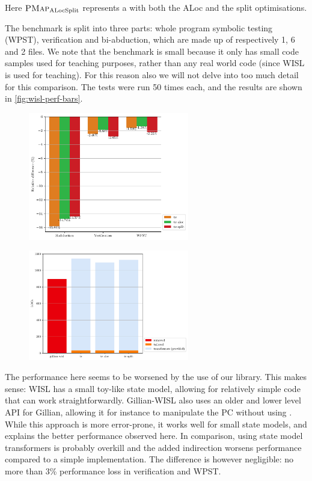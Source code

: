 Here $\textsc{PMap}_{\text{ALocSplit}}$ represents a \PMap{} with both the ALoc and the split optimisations.

The benchmark is split into three parts: whole program symbolic testing (WPST), verification and bi-abduction, which are made up of respectively 1, 6 and 2 files. We note that the benchmark is small because it only has small code samples used for teaching purposes, rather than any real world code (since WISL is used for teaching). For this reason also we will not delve into too much detail for this comparison. The tests were run 50 times each, and the results are shown in \autoref{fig:wisl-perf-bars}.

\begin{figure}
\captionsetup{width=.4\linewidth}
\centering
\begin{minipage}[t]{.45\textwidth}
	\centering
	\includegraphics[width=7cm]{figures/wisl/avg_mode_relative_diff.pdf}
	\label{fig:wisl-perf-bars}
\end{minipage}\hfill%
\begin{minipage}[t]{.45\textwidth}
	\centering
	\includegraphics[width=7cm]{figures/wisl/locs.pdf}
	\label{fig:wisl-locs}
\end{minipage}%
\end{figure}

The performance here seems to be worsened by the use of our library. This makes sense: WISL has a small toy-like state model, allowing for relatively simple code that can work straightforwardly. Gillian-WISL also uses an older and lower level API for Gillian, allowing it for instance to manipulate the PC without using . While this approach is more error-prone, it works well for small state models, and explains the better performance observed here. In comparison, using state model transformers is probably overkill and the added indirection worsens performance compared to a simple implementation. The difference is however negligible: no more than 3\% performance loss in verification and WPST.

